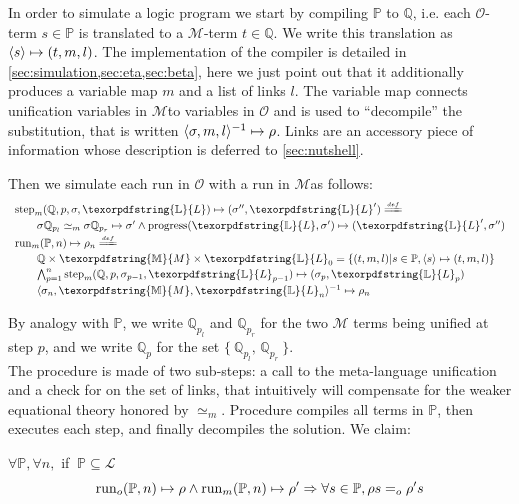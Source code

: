 \documentclass[sigconf,natbib=false,review]{acmart}
\newcommand{\EqualRel}{\ensuremath{=}}
\newcommand{\UnifRel}{\ensuremath{\simeq}}
\newcommand{\Eo}{\ensuremath{\EqualRel_o}\xspace}
\newcommand{\Ue}{\ensuremath{\UnifRel_m}\xspace}
\newcommand{\llambda}{\ensuremath{\mathcal{L}}\xspace}
\newcommand{\Fo}{\texorpdfstring{\ensuremath{\mathcal{O}}\xspace}{O}}
\newcommand{\Ho}{\texorpdfstring{\ensuremath{\mathcal{M}}\xspace}{M}}
\newcommand{\linkStore}{\texorpdfstring{\ensuremath{\mathbb{L}}\xspace}{L}}
\newcommand{\mapStore}{\texorpdfstring{\ensuremath{\mathbb{M}}\xspace}{M}}
\newcommand{\foUnifPb}{\ensuremath{\mathbb{P}}\xspace}
\newcommand{\hoUnifPb}{\ensuremath{\mathbb{Q}}\xspace}
\begin{document}
\noindent
In order to simulate a logic program we start by compiling
\foUnifPb to \hoUnifPb, i.e.
each \Fo{}-term $s \in \foUnifPb$ is translated to a \Ho{}-term $t \in \hoUnifPb$.
We write this translation as $\langle s \rangle\mapsto(t,m,l)$. The implementation of the compiler
is detailed in \cref{sec:simulation,sec:eta,sec:beta}, here we just point
out that it additionally produces a variable map $m$ and a list of links $l$.
The variable map connects unification variables in \Ho to variables
in \Fo{} and is used to ``decompile'' the substitution, that is written
$\langle \sigma,m,l \rangle^{-1}\mapsto \rho$. Links are an accessory piece of information whose
description is deferred to \cref{sec:nutshell}.

Then we simulate each run in \Fo{} with a run in \Ho as follows:
%
$$
\begin{array}{l}
\stepH{\hoUnifPb}{p}{\sigma}{\linkStore}{\sigma''}{\linkStore'} \deff\vspace{2pt}\\
  \qquad\stepHD{\hoUnifPb}{p}{\sigma}{\sigma'}{\sigma''}{\linkStore}\vspace{2pt}\\
  \runH{\foUnifPb}{n}{\rho} \deff \vspace{2pt}\\
  \qquad \hoUnifPb \times \mapStore \times \linkStore_0 = \{ (t,m,l) | s \in \foUnifPb, \C{s}{t}{m}{l} \}\vspace{2pt}\\
  \qquad \runHD{\hoUnifPb}{n}{\linkStore}\vspace{2pt}\\
  \qquad \D{\sigma_{n}}{\mapStore}{\linkStore_{n}}{\rho_{n}}
\end{array}
$$

\noindent
By analogy with \foUnifPb, we write $\hoUnifPb_{p_l}$ and $\hoUnifPb_{p_r}$
for the two \Ho{} terms being unified at step $p$, and we write $\hoUnifPb_p$
for the set $\{~ \hoUnifPb_{p_l},\, \hoUnifPb_{p_r} ~\}$.\\
The \hstep{} procedure is made of two sub-steps: a call to the meta-language
unification and a check for \progress{} on the set of links, that intuitively
will compensate for the weaker equational theory honored by \Ue.
Procedure \hrun{} compiles all terms in \foUnifPb{}, then executes each step, and
finally decompiles the solution.
We claim:

\begin{proposition}\label{prop:simulation}
$\forall \foUnifPb, \forall n,$ if $~\foUnifPb \subseteq \llambda$
$$
  \runFx{\foUnifPb}{n}{\rho} \land
  \runHx{\foUnifPb}{n}{\rho'}
  \Rightarrow
  \forall s \in \foUnifPb, \rho s \Eo \rho' s
$$
\end{proposition}
\end{document}

